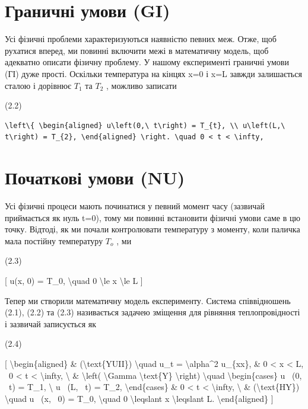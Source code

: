 \documentclass[
]{article}
\begin{document}
\section{Граничні умови
(GI)}\label{ux433ux440ux430ux43dux438ux447ux43dux456-ux443ux43cux43eux432ux438-gi}

Усі фізичні проблеми характеризуються наявністю певних меж. Отже, щоб
рухатися вперед, ми повинні включити межі в математичну модель, щоб
адекватно описати фізичну проблему. У нашому експерименті граничні умови
(ГІ) дуже прості. Оскільки температура на кінцях x=0 і x=L завжди
залишається сталою і дорівнює \(T_1\) та \(T_2\) , можливо записати

(2.2)

\begin{verbatim}
\left\{ \begin{aligned} u\left(0,\ t\right) = T_{t}, \\ u\left(L,\ t\right) = T_{2}, \end{aligned} \right. \quad 0 < t < \infty,
\end{verbatim}

\section{Початкові умови
(NU)}\label{ux43fux43eux447ux430ux442ux43aux43eux432ux456-ux443ux43cux43eux432ux438-nu}

Усі фізичні процеси мають починатися у певний момент часу (зазвичай
приймається як нуль t=0), тому ми повинні встановити фізичні умови саме
в цю точку. Відтоді, як ми почали контролювати температуру з моменту,
коли паличка мала постійну температуру \(T_{\mathrm{ }o}\) , ми

(2.3)

{[} u(x, 0) = T\_0, \textbackslash quad 0 \textbackslash le x
\textbackslash le L {]}

Тепер ми створили математичну модель експерименту. Система співвідношень
(2.1), (2.2) та (2.3) називається задачею зміщення для рівняння
теплопровідності і зазвичай записується як

(2.4)

{[} \textbackslash begin\{aligned\} \& (\textbackslash text\{YUII\})
\textbackslash quad u\_t = \textbackslash alpha\^{}2 u\_\{xx\}, \& 0
\textless{} x \textless{} L, ~0 \textless{} t \textless{}
\textbackslash infty, \textbackslash{} \& \textbackslash left(
\textbackslash Gamma \textbackslash text\{Y\} \textbackslash right)
\textbackslash quad \textbackslash begin\{cases\} u ~(0, ~t) = T\_1,
\textbackslash{} u ~(L, ~t) = T\_2, \textbackslash end\{cases\} \& 0
\textless{} t \textless{} \textbackslash infty, \textbackslash{} \&
(\textbackslash text\{HY\}) \textbackslash quad u ~(x, ~0) = T\_0,
\textbackslash quad 0 \textbackslash leqslant x \textbackslash leqslant
L. \textbackslash end\{aligned\} {]}
\end{document}
